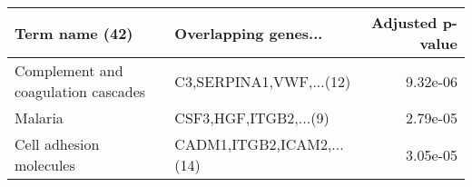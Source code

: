 \begin{tabular}{llr}
\toprule
                     Term name (42) &      Overlapping genes... &  Adjusted p-value \\
\midrule
Complement and coagulation cascades &   C3,SERPINA1,VWF,...(12) &          9.32e-06 \\
                            Malaria &     CSF3,HGF,ITGB2,...(9) &          2.79e-05 \\
            Cell adhesion molecules & CADM1,ITGB2,ICAM2,...(14) &          3.05e-05 \\
\bottomrule
\end{tabular}
